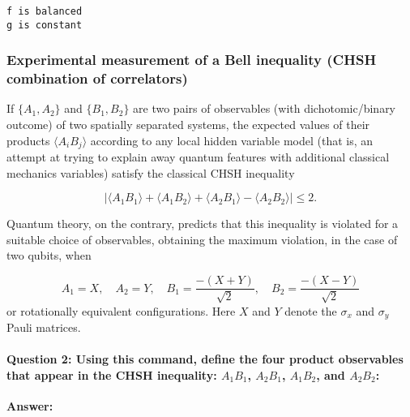 \documentclass[11pt]{article}
\begin{document}
    \begin{Verbatim}[commandchars=\\\{\}]
f is balanced
g is constant
    \end{Verbatim}

    \subsubsection{\texorpdfstring{\textbf{Experimental measurement of a
Bell inequality (CHSH combination of
correlators)}}{Experimental measurement of a Bell inequality   (CHSH combination of correlators)}}\label{experimental-measurement-of-a-bell-inequality-chsh-combination-of-correlators}

If \(\{A_1, A_2\}\) and \(\{B_1,B_2\}\) are two pairs of observables
(with dichotomic/binary outcome) of two spatially separated systems, the
expected values of their products \(\langle A_i B_j \rangle\) according
to any local hidden variable model (that is, an attempt at trying to
explain away quantum features with additional classical mechanics
variables) satisfy the classical CHSH inequality

\[
|\langle A_1 B_1\rangle +\langle A_1 B_2\rangle + \langle A_2 B_1\rangle - \langle A_2 B_2\rangle|\leq 2 .
\]

Quantum theory, on the contrary, predicts that this inequality is
violated for a suitable choice of observables, obtaining the maximum
violation, in the case of two qubits, when

\[
A_1=X,\quad A_2=Y, \quad B_1=\frac{-(X+Y)}{\sqrt{2}}, \quad B_2=\frac{-(X-Y)}{\sqrt{2}}
\] or rotationally equivalent configurations. Here \(X\) and \(Y\)
denote the \(\sigma_x\) and \(\sigma_y\) Pauli matrices.

    \paragraph{\texorpdfstring{ \textbf{Question 2}: Using this command,
define the four product observables that appear in the CHSH inequality:
\(A_1B_1\), \(A_2B_1\), \(A_1B_2\), and \(A_2B_2\):
}{ Question 2: Using this command, define the four product observables that appear in the CHSH inequality: A\_1B\_1, A\_2B\_1, A\_1B\_2, and A\_2B\_2: }}\label{question-2-using-this-command-define-the-four-product-observables-that-appear-in-the-chsh-inequality-a_1b_1-a_2b_1-a_1b_2-and-a_2b_2}

\textbf{Answer:}
\end{document}
